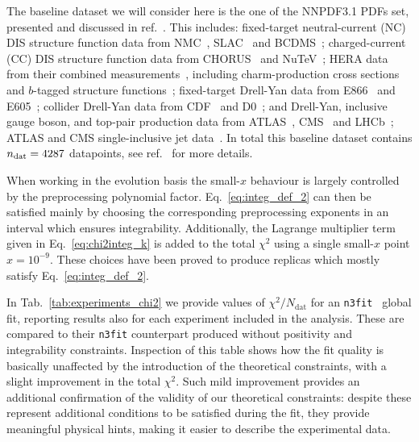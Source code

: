 %
The baseline dataset we will consider here is the one of the NNPDF3.1 PDFs set, presented and discussed in ref.~\cite{Ball:2017nwa}.
This includes: fixed-target neutral-current 
(NC) DIS structure function data from NMC~\cite{Arneodo:1996kd,Arneodo:1996qe}, 
SLAC~\cite{Whitlow:1991uw} and BCDMS~\cite{Benvenuti:1989rh}; charged-current 
(CC) DIS structure function data from CHORUS~\cite{Onengut:2005kv} and 
NuTeV~\cite{Goncharov:2001qe,Mason:2006qa}; HERA data from their combined 
measurements~\cite{Abramowicz:2015mha}, including charm-production cross 
sections~\cite{Abramowicz:1900rp} and $b$-tagged structure 
functions~\cite{Aaron:2009af,Abramowicz:2014zub}; fixed-target Drell-Yan data 
from E866~\cite{Webb:2003ps,Webb:2003bj,Towell:2001nh} and 
E605~\cite{Moreno:1990sf}; collider Drell-Yan data from 
CDF~\cite{Aaltonen:2010zza} and D0~\cite{Abazov:2007jy,
Abazov:2013rja,D0:2014kma}; and Drell-Yan, inclusive gauge boson, and top-pair
production data from 
ATLAS~\cite{Aad:2013iua,Aad:2014qja,Aad:2011dm,Aaboud:2016btc,Aad:2015auj,
Aad:2014kva,Aaboud:2016pbd,Aad:2015mbv}, CMS~\cite{Chatrchyan:2012xt,
Chatrchyan:2013mza,Chatrchyan:2013tia,Khachatryan:2016pev,Khachatryan:2015oaa,
Khachatryan:2016mqs,Khachatryan:2015uqb,Khachatryan:2015oqa} 
and LHCb~\cite{Aaij:2012vn,Aaij:2012mda,Aaij:2015gna,Aaij:2015zlq};
ATLAS and CMS single-inclusive jet data~\cite{Aad:2014vwa, Khachatryan:2015luy}.
In total this baseline dataset contains $n_{\rm dat}=4287$
datapoints, see ref.~\cite{Ball:2017nwa} for more details.

%
When working in the evolution basis the small-$x$ behaviour is largely controlled by the preprocessing
polynomial factor. Eq.~\eqref{eq:integ_def_2}
can then be satisfied mainly by choosing the corresponding preprocessing exponents in an interval which ensures integrability.
Additionally, the Lagrange multiplier term given in Eq.~\eqref{eq:chi2integ_k} is added to the
total $\chi^2$ using a single small-$x$ point $x=10^{-9}$. These choices have been proved to
produce replicas which mostly satisfy Eq.~\eqref{eq:integ_def_2}. 

%
In Tab.~\ref{tab:experiments_chi2} we provide values of $\chi^2/N_{\text{dat}}$ for an {\tt n3fit } global fit,
reporting results also for each experiment included in the analysis.
These are compared to their {\tt n3fit} counterpart produced without positivity and integrability constraints. 
Inspection of this table shows how the fit quality is basically unaffected by the introduction of the
theoretical constraints, with a slight improvement in the total $\chi^2$. Such mild improvement provides an
additional confirmation of the validity of our theoretical constraints: despite these represent additional 
conditions to be satisfied during the fit, they provide meaningful physical hints, making it easier to describe 
the experimental data.
 
